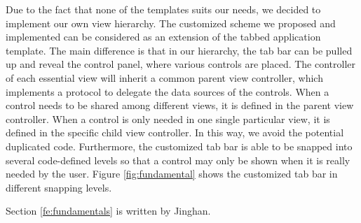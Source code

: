 \documentclass[12pt,a4paper]{article}
\begin{document}
            Due to the fact that none of the templates suits our needs, we decided to implement our own view hierarchy. The customized scheme we proposed and implemented can be considered as an extension of the tabbed application template. The main difference is that in our hierarchy, the tab bar can be pulled up and reveal the control panel, where various controls are placed. The controller of each essential view will inherit a common parent view controller, which implements a protocol to delegate the data sources of the controls. When a control needs to be shared among different views, it is defined in the parent view controller. When a control is only needed in one single particular view, it is defined in the specific child view controller. In this way, we avoid the potential duplicated code. Furthermore, the customized tab bar is able to be snapped into several code-defined levels so that a control may only be shown when it is really needed by the user. Figure \ref{fig:fundamental} shows the customized tab bar in different snapping levels.
            
            \footnotesize
            Section \ref{fe:fundamentals} is written by Jinghan.
            \normalsize
            
\end{document}

